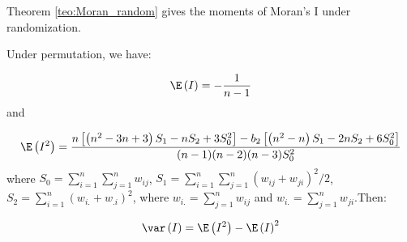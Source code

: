 








Theorem \ref{teo:Moran_random} gives the moments of Moran's I under randomization. 


\begin{theorem}\label{teo:Moran_random}
Under permutation, we have:

\begin{equation}
\E\left(I\right) = - \frac{1}{n - 1} 
\end{equation}
%
and

\begin{equation}
\E\left(I^2\right) = \frac{n\left[\left(n^2 - 3n + 3\right)S_1 - nS_2 + 3S_0^2\right]-b_2\left[\left(n^2 - n\right)S_1 - 2nS_2 + 6S_0^2\right]}{(n-1)(n-2)(n-3)S_0^2}
\end{equation}
%
where $S_0=\sum_{i = 1}^n\sum_{j=1}^nw_{ij}$, $S_1= \sum_{i = 1}^n\sum_{j = 1}^n(w_{ij} + w_{ji})^2/2$, $S_2 = \sum_{i = 1}^n(w_{i.} + w_{.i})^2$, where $w_{i.}= \sum_{j = 1}^nw_{ij}$ and $w_{i.}=\sum_{j = 1}^nw_{ji}$.Then:

\begin{equation}
\var\left(I\right)=\E\left(I^2\right) - \E\left(I\right)^2
\end{equation}
\end{theorem}

